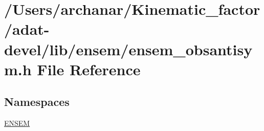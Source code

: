 \hypertarget{adat-devel_2lib_2ensem_2ensem__obsantisym_8h}{}\section{/\+Users/archanar/\+Kinematic\+\_\+factor/adat-\/devel/lib/ensem/ensem\+\_\+obsantisym.h File Reference}
\label{adat-devel_2lib_2ensem_2ensem__obsantisym_8h}
\subsection*{Namespaces}
\begin{DoxyCompactItemize}
\item 
 \mbox{\hyperlink{namespaceENSEM}{E\+N\+S\+EM}}
\end{DoxyCompactItemize}
